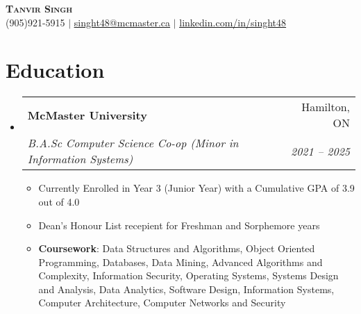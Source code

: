\documentclass[letterpaper,11pt]{article}
\makeatletter
\newcommand{\resumeItem}[1]{
  \item\small{
    {#1 \vspace{-2pt}}
  }
}
\newcommand{\resumeSubheading}[4]{
  \vspace{-2pt}\item
    \begin{tabular*}{0.97\textwidth}[t]{l@{\extracolsep{\fill}}r}
      \textbf{#1} & #2 \\
      \textit{\small#3} & \textit{\small #4} \\
    \end{tabular*}\vspace{-7pt}
}
\newcommand{\resumeSubHeadingListStart}{\begin{itemize}[leftmargin=0.15in, label={}]}
\newcommand{\resumeSubHeadingListEnd}{\end{itemize}}
\newcommand{\resumeItemListStart}{\begin{itemize}}
\newcommand{\resumeItemListEnd}{\end{itemize}\vspace{-5pt}}
\makeatother
\begin{document}
\begin{center}
    \textbf{\Huge \scshape Tanvir Singh} \\ \vspace{1pt}
    \small (905)921-5915 $|$ 
    \href{mailto:singht48@mcmaster.ca}{\underline{singht48@mcmaster.ca}} $|$ 
    \href{https://linkedin.com/in/singht48}{\underline{linkedin.com/in/singht48}} 
\end{center}



\section{Education}
  \resumeSubHeadingListStart
    \resumeSubheading
      {McMaster University}{Hamilton, ON}
      {B.A.Sc Computer Science Co-op (Minor in Information Systems)}{2021 -- 2025}
      \resumeItemListStart
        \resumeItem{Currently Enrolled in Year 3 (Junior Year) with a Cumulative GPA of 3.9 out of 4.0}
        \resumeItem{Dean's Honour List recepient for Freshman and Sorphemore years}
        \resumeItem{\textbf{Coursework}: Data Structures and Algorithms, Object Oriented Programming, Databases, Data Mining, Advanced Algorithms and Complexity, Information Security, Operating Systems, Systems Design and Analysis, Data Analytics, Software Design, Information Systems, Computer Architecture, Computer Networks and Security}
      \resumeItemListEnd
  \resumeSubHeadingListEnd
  
\end{document}
